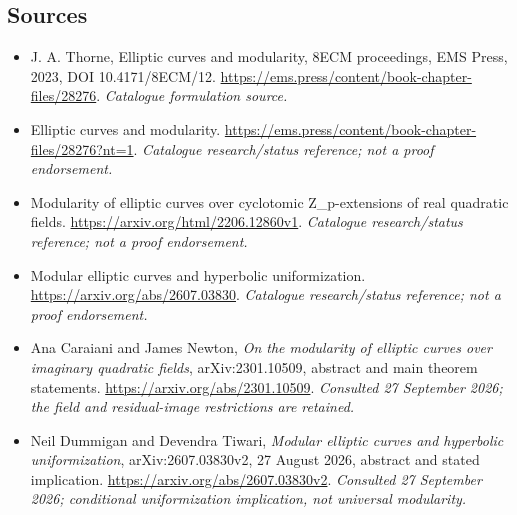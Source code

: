 \documentclass[11pt,a4paper]{article}
\numberwithin{equation}{section}
\begin{document}

\subsection{Sources}
\begin{itemize}\raggedright
\item[\textnormal{[S1]}]\hypertarget{source:39:1}{} J. A. Thorne, Elliptic curves and modularity, 8ECM proceedings, EMS Press, 2023, DOI 10.4171/8ECM/12.
\url{https://ems.press/content/book-chapter-files/28276}.
{\small\textit{Catalogue formulation source.}}
\item[\textnormal{[S2]}]\hypertarget{source:39:2}{} Elliptic curves and modularity.
\url{https://ems.press/content/book-chapter-files/28276?nt=1}.
{\small\textit{Catalogue research/status reference; not a proof endorsement.}}
\item[\textnormal{[S3]}]\hypertarget{source:39:3}{} Modularity of elliptic curves over cyclotomic Z\_p-extensions of real quadratic fields.
\url{https://arxiv.org/html/2206.12860v1}.
{\small\textit{Catalogue research/status reference; not a proof endorsement.}}
\item[\textnormal{[S4]}]\hypertarget{source:39:4}{} Modular elliptic curves and hyperbolic uniformization.
\url{https://arxiv.org/abs/2607.03830}.
{\small\textit{Catalogue research/status reference; not a proof endorsement.}}
\item[\textnormal{[E1]}]\hypertarget{extra:39:1}{} Ana Caraiani and James Newton,
\emph{On the modularity of elliptic curves over imaginary quadratic fields},
arXiv:2301.10509, abstract and main theorem statements.
\url{https://arxiv.org/abs/2301.10509}.
{\small\textit{Consulted 27 September 2026; the field and residual-image restrictions are retained.}}
\item[\textnormal{[E2]}]\hypertarget{extra:39:2}{} Neil Dummigan and Devendra Tiwari,
\emph{Modular elliptic curves and hyperbolic uniformization},
arXiv:2607.03830v2, 27 August 2026, abstract and stated implication.
\url{https://arxiv.org/abs/2607.03830v2}.
{\small\textit{Consulted 27 September 2026; conditional uniformization implication, not universal modularity.}}

\end{itemize}

\end{document}
